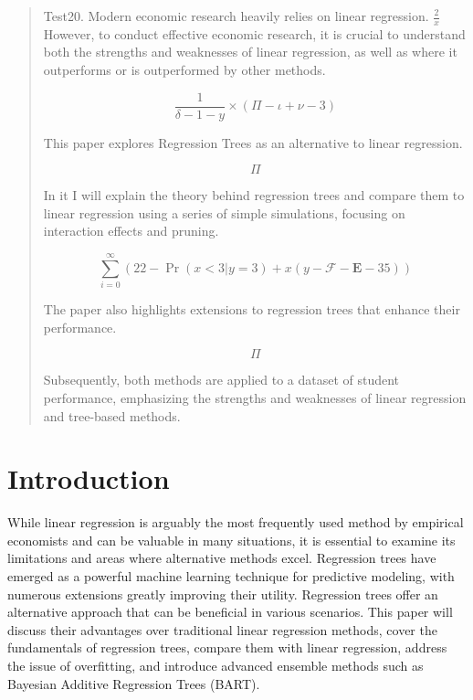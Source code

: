 \documentclass[12pt]{article}
\begin{document}



\begin{abstract}
    Test20. Modern economic research heavily relies on linear regression. $\frac{2}{x}$ However, to conduct effective economic research, it is crucial to understand both the strengths and weaknesses of linear regression, as well as where it outperforms or is outperformed by other methods.

    $$\frac{1}{\delta - 1 - y} \times (\Pi - \iota + \nu - 3 )$$

    This paper explores Regression Trees as an alternative to linear regression.

    \begin{equation}
        \Pi
    \end{equation}

    In it I will explain the theory behind regression trees and compare them to linear regression using a series of simple simulations, focusing on interaction effects and pruning.

    $$
        \sum_{i = 0}^{\infty}(22 - \Pr ( x < 3 | y = 3) + x(y - \mathcal{F} - \mathbf{E} - 35))
    $$

    The paper also highlights extensions to regression trees that enhance their performance.

    \begin{equation}
        \varPi
    \end{equation}

    Subsequently, both methods are applied to a dataset of student performance, emphasizing the strengths and weaknesses of linear regression and tree-based methods.
\end{abstract}



\newpage

\tableofcontents

\newpage


\section{Introduction}
While linear regression is arguably the most frequently used method by empirical economists and can be valuable in many situations, it is essential to examine its limitations and areas where alternative methods excel. Regression trees have emerged as a powerful machine learning technique for predictive modeling, with numerous extensions greatly improving their utility. Regression trees offer an alternative approach that can be beneficial in various scenarios. This paper will discuss their advantages over traditional linear regression methods, cover the fundamentals of regression trees, compare them with linear regression, address the issue of overfitting, and introduce advanced ensemble methods such as Bayesian Additive Regression Trees (BART).
\end{document}
